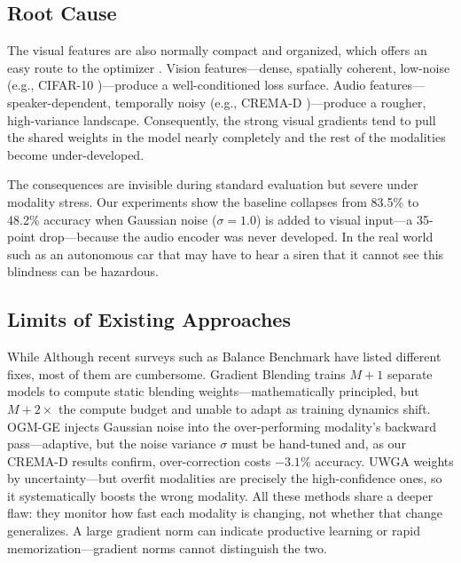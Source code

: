 \documentclass[10pt, twocolumn, letterpaper]{article}
\begin{document}
\subsection*{Root Cause}
The visual features are also normally compact and organized, which offers an easy route to the optimizer \cite{pezeshki2021gradient}. Vision features---dense, spatially coherent, low-noise (e.g., CIFAR-10 \cite{krizhevsky2009learning})---produce a well-conditioned loss surface. Audio features---speaker-dependent, temporally noisy (e.g., CREMA-D \cite{cao2014crema})---produce a rougher, high-variance landscape. Consequently, the strong visual gradients tend to pull the shared weights in the model nearly completely and the rest of the modalities become under-developed.

The consequences are invisible during standard evaluation but severe under modality stress. Our experiments show the baseline collapses from 83.5\% to 48.2\% accuracy when Gaussian noise ($\sigma = 1.0$) is added to visual input---a 35-point drop---because the audio encoder was never developed. In the real world such as an autonomous car that may have to hear a siren that it cannot see this blindness can be hazardous.

\subsection*{Limits of Existing Approaches}
While Although recent surveys such as Balance Benchmark \cite{xu2025balancebenchmark} have listed different fixes, most of them are cumbersome. Gradient Blending \cite{wang2020makes} trains $M{+}1$ separate models to compute static blending weights---mathematically principled, but $M{+}2\times$ the compute budget and unable to adapt as training dynamics shift. OGM-GE \cite{peng2022balanced} injects Gaussian noise into the over-performing modality's backward pass---adaptive, but the noise variance $\sigma$ must be hand-tuned and, as our CREMA-D results confirm, over-correction costs $-3.1\%$ accuracy. UWGA \cite{kendall2018multi} weights by uncertainty---but overfit modalities are precisely the high-confidence ones, so it systematically boosts the wrong modality. All these methods share a deeper flaw: they monitor how fast each modality is changing, not whether that change generalizes. A large gradient norm can indicate productive learning or rapid memorization---gradient norms cannot distinguish the two.
\end{document}
